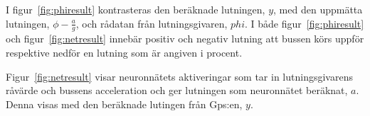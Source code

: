 I figur~\ref{fig:phiresult} kontrasteras den beräknade lutningen, $y$, med den
uppmätta lutningen, $ \phi - \frac{a}{g} $, och rådatan från
lutningsgivaren, $phi$.
I både figur~\ref{fig:phiresult} och figur~\ref{fig:netresult}
innebär positiv och negativ lutning att bussen körs uppför respektive
nedför en lutning som är angiven i procent.

Figur~\ref{fig:netresult} visar neuronnätets aktiveringar som tar in
lutningsgivarens råvärde och bussens acceleration
och ger lutningen som neuronnätet beräknat, $a$.
Denna visas med den beräknade lutingen från Gps:en, $y$.
